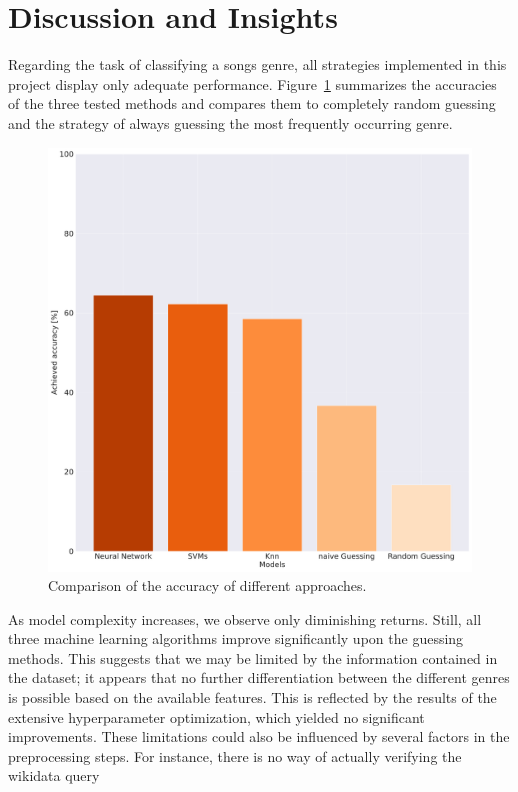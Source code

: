 \documentclass[
  12pt,
  bibliography=totoc,     %
  captions=tableheading,  %
  titlepage=firstiscover, %
]{scrartcl}
\begin{document}
\section{Discussion and Insights}
Regarding the task of classifying a songs genre, all strategies implemented in this project display only adequate performance. Figure~\ref{fig:performance_comp}
summarizes the accuracies of the three tested methods and compares them to completely random guessing and the strategy of always guessing the most frequently occurring
genre.
\begin{figure}[H]
  \centering
  \includegraphics[scale=0.18]{figures/performance-comparison.pdf}
  \caption{Comparison of the accuracy of different approaches.}
  \label{fig:performance_comp}
\end{figure}
\noindent
As model complexity increases, we observe only diminishing returns. Still, all three machine learning algorithms improve significantly upon the guessing
methods. This suggests that we may be  limited by the information contained in the dataset; it appears that no further differentiation between the different genres is
possible based on the available features. This is reflected by the results of the extensive hyperparameter optimization, which yielded no significant improvements.
These limitations could also be influenced by several factors in the preprocessing steps. For instance, there is no way of actually verifying the wikidata query
\end{document}
